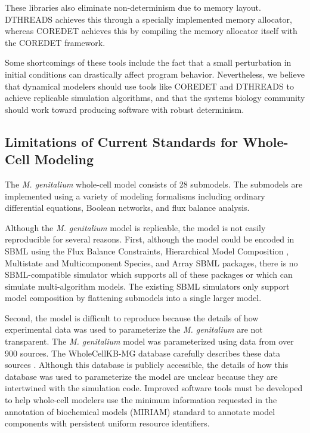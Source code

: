 \documentclass[journal,transmag,twoside]{IEEEtran}
\begin{document}
These libraries also eliminate non-determinism
due to memory layout. D{\small THREADS} achieves this through a specially implemented memory allocator,
whereas C{\small ORE}D{\small ET} achieves this by compiling the
memory allocator itself with the C{\small ORE}D{\small ET} framework.

Some shortcomings of these tools include the fact that a small perturbation in initial
conditions can drastically affect program behavior.
Nevertheless, we believe that
dynamical modelers should use tools like C{\small ORE}D{\small ET} and D{\small THREADS}
to achieve replicable simulation algorithms, and that the systems biology community should
work toward producing software with robust determinism.

\subsection{Limitations of Current Standards for Whole-Cell Modeling}

The \textit{M. genitalium} whole-cell model \cite{Karr2012} consists of 28 submodels.
The submodels are implemented using a variety of modeling formalisms including
ordinary differential equations, Boolean networks, and flux balance analysis.

Although the \textit{M. genitalium} model is replicable, the model is not easily reproducible for several reasons. First,
although the model could be encoded in SBML using the Flux Balance Constraints, Hierarchical Model Composition \cite{smith2015sbml}, Multistate and Multicomponent
Species, and Array SBML packages, there is no SBML-compatible simulator which supports all of these packages or 
which can simulate multi-algorithm models. The existing SBML simulators only support 
model composition by flattening submodels into a single larger model. 

Second, the model is difficult to reproduce because the details of how experimental data was used to parameterize the \textit{M. genitalium}
are not transparent. The \textit{M. genitalium} model was parameterized using data from over 900 
sources. The WholeCellKB-MG database carefully describes these data sources \cite{karr2013wholecellkb}. Although this database is publicly accessible, 
the details of how this database was used to parameterize the model are unclear
because they are intertwined with the simulation code. 
Improved software tools must be developed to help whole-cell modelers use the minimum information 
requested in the annotation of biochemical models (MIRIAM) \cite{novere2005minimum}
standard to annotate model components with persistent uniform resource identifiers. 
\end{document}
